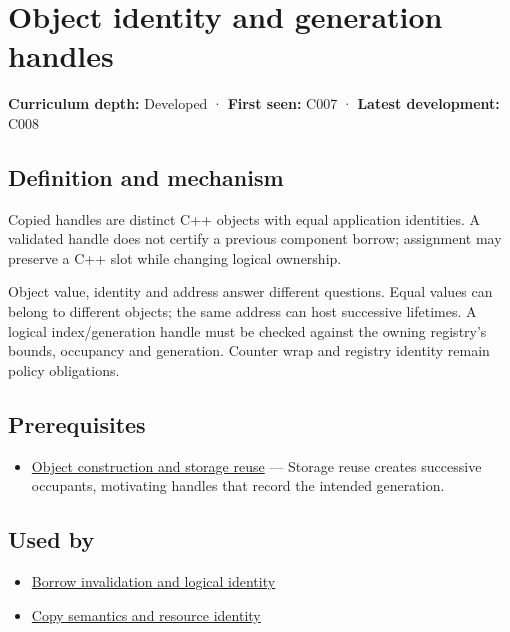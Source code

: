 \hypertarget{appendix-f1581457d322}{}\label{referencestart:appendix-f1581457d322}
\section{Object identity and generation handles}\label{appendix-f1581457d322-object-identity-and-generation-handles}

\textbf{Curriculum depth:} Developed · \textbf{First seen:} C007 · \textbf{Latest development:} C008

\begin{allmightroledefinition}

\subsection{Definition and mechanism}\label{appendix-f1581457d322-definition-and-mechanism}

Copied handles are distinct C++ objects with equal application identities. A validated handle does not certify a previous component borrow; assignment may preserve a C++ slot while changing logical ownership.

\end{allmightroledefinition}

Object value, identity and address answer different questions. Equal values can belong to different objects; the same address can host successive lifetimes. A logical index/generation handle must be checked against the owning registry's bounds, occupancy and generation. Counter wrap and registry identity remain policy obligations.

\subsection{Prerequisites}\label{appendix-f1581457d322-prerequisites}

\begin{itemize}
\tightlist
\item
  \hyperref[appendix-a82f9c438857]{Object construction and storage reuse} --- Storage reuse creates successive occupants, motivating handles that record the intended generation.
\end{itemize}

\subsection{Used by}\label{appendix-f1581457d322-used-by}

\begin{itemize}
\tightlist
\item
  \hyperref[appendix-f9b8b9188c7f]{Borrow invalidation and logical identity}
\item
  \hyperref[appendix-1340cd1ce582]{Copy semantics and resource identity}
\end{itemize}

